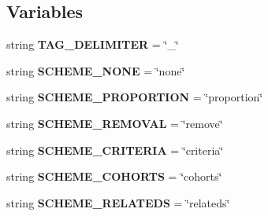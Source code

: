 \subsection*{Variables}
\begin{DoxyCompactItemize}
\item 
string {\bfseries T\+A\+G\+\_\+\+D\+E\+L\+I\+M\+I\+T\+ER} = \char`\"{}\+\_\+\char`\"{}\hypertarget{namespacenegui_1_1genepopfilesampler_a218e2f958da027b600c72bb577a3ff39}{}\label{namespacenegui_1_1genepopfilesampler_a218e2f958da027b600c72bb577a3ff39}

\item 
string {\bfseries S\+C\+H\+E\+M\+E\+\_\+\+N\+O\+NE} = \char`\"{}none\char`\"{}\hypertarget{namespacenegui_1_1genepopfilesampler_a28ebe15ea3a6144faad3f28e8ae22934}{}\label{namespacenegui_1_1genepopfilesampler_a28ebe15ea3a6144faad3f28e8ae22934}

\item 
string {\bfseries S\+C\+H\+E\+M\+E\+\_\+\+P\+R\+O\+P\+O\+R\+T\+I\+ON} = \char`\"{}proportion\char`\"{}\hypertarget{namespacenegui_1_1genepopfilesampler_a08d38d14135ba2b092e3090b0e1e74b1}{}\label{namespacenegui_1_1genepopfilesampler_a08d38d14135ba2b092e3090b0e1e74b1}

\item 
string {\bfseries S\+C\+H\+E\+M\+E\+\_\+\+R\+E\+M\+O\+V\+AL} = \char`\"{}remove\char`\"{}\hypertarget{namespacenegui_1_1genepopfilesampler_a0257c159f203d90380dfed2404ccc3a1}{}\label{namespacenegui_1_1genepopfilesampler_a0257c159f203d90380dfed2404ccc3a1}

\item 
string {\bfseries S\+C\+H\+E\+M\+E\+\_\+\+C\+R\+I\+T\+E\+R\+IA} = \char`\"{}criteria\char`\"{}\hypertarget{namespacenegui_1_1genepopfilesampler_a588f1b68f192dd6901bac76e51979419}{}\label{namespacenegui_1_1genepopfilesampler_a588f1b68f192dd6901bac76e51979419}

\item 
string {\bfseries S\+C\+H\+E\+M\+E\+\_\+\+C\+O\+H\+O\+R\+TS} = \char`\"{}cohorts\char`\"{}\hypertarget{namespacenegui_1_1genepopfilesampler_ac13c205986ea013af9a7b7a908529e93}{}\label{namespacenegui_1_1genepopfilesampler_ac13c205986ea013af9a7b7a908529e93}

\item 
string {\bfseries S\+C\+H\+E\+M\+E\+\_\+\+R\+E\+L\+A\+T\+E\+DS} = \char`\"{}relateds\char`\"{}\hypertarget{namespacenegui_1_1genepopfilesampler_acec997bb8951673a46f30157dd69973e}{}\label{namespacenegui_1_1genepopfilesampler_acec997bb8951673a46f30157dd69973e}


\end{DoxyCompactItemize}
